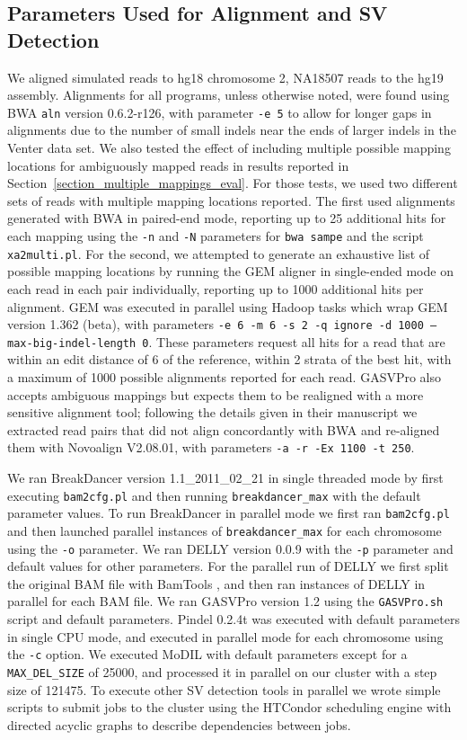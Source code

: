 \subsection{Parameters Used for Alignment and SV Detection}

We aligned simulated reads to hg18 chromosome 2, NA18507 reads to the hg19 assembly. Alignments for all programs, unless otherwise noted, were found using BWA \texttt{aln} version 0.6.2-r126, with parameter \texttt{-e 5} to allow for longer gaps in alignments due to the number of small indels near the ends of larger indels in the Venter data set. We also tested the effect of including multiple possible mapping locations for ambiguously mapped reads in results reported in Section~\ref{section_multiple_mappings_eval}. For those tests, we used two different sets of reads with multiple mapping locations reported. The first used alignments generated with BWA in paired-end mode, reporting up to 25 additional hits for each mapping  using the \texttt{-n} and \texttt{-N} parameters for \texttt{bwa sampe} and the script \texttt{xa2multi.pl}. For the second, we attempted to generate an exhaustive list of possible mapping locations by running the GEM aligner in single-ended mode on each read in each pair individually, reporting up to 1000 additional hits per alignment. GEM was executed in parallel using Hadoop tasks which wrap GEM version 1.362 (beta), with parameters \texttt{-e 6 -m 6 -s 2 -q ignore -d 1000 --max-big-indel-length 0}. These parameters request all hits for a read that are within an edit distance of 6 of the reference, within 2 strata of the best hit, with a maximum of 1000 possible alignments reported for each read. GASVPro also accepts ambiguous mappings but expects them to be realigned with a more sensitive alignment tool; following the details given in their manuscript we extracted read pairs that did not align concordantly with BWA and re-aligned them with Novoalign V2.08.01, with parameters \texttt{-a -r -Ex 1100 -t 250}. 

We ran BreakDancer version 1.1\_2011\_02\_21 in single threaded mode by first executing \texttt{bam2cfg.pl} and then running \texttt{breakdancer\_max} with the default parameter values.  To run BreakDancer in parallel mode we first ran \texttt{bam2cfg.pl} and then launched parallel instances of \texttt{breakdancer\_max} for each chromosome using the \texttt{-o} parameter. We ran DELLY version 0.0.9 with the \texttt{-p} parameter and default values for other parameters. For the parallel run of DELLY we first split the original BAM file with BamTools \cite{Barnett:2011hm}, and then ran instances of DELLY in parallel for each BAM file. We ran GASVPro version 1.2 using the \texttt{GASVPro.sh} script and default parameters. Pindel 0.2.4t was executed with default parameters in single CPU mode, and executed in parallel mode for each chromosome using the \texttt{-c} option. We executed MoDIL with default parameters except for a \texttt{MAX\_DEL\_SIZE} of 25000, and processed it in parallel on our cluster with a step size of 121475. To execute other SV detection tools in parallel we wrote simple scripts to submit jobs to the cluster using the HTCondor scheduling engine \cite{condor-practice} with directed acyclic graphs to describe dependencies between jobs. 

